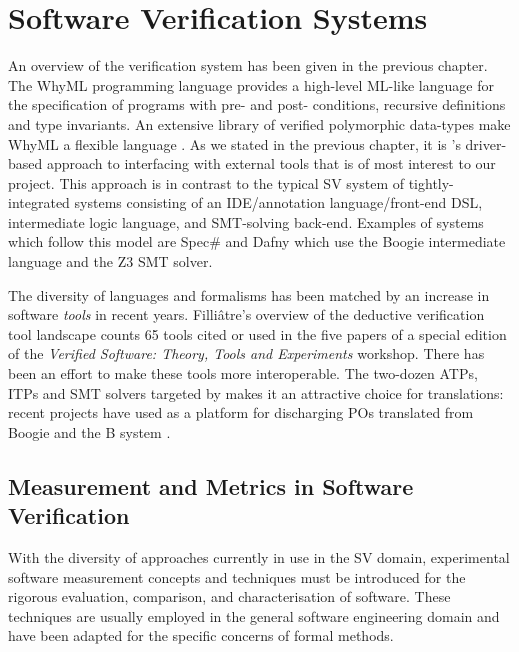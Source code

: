 \section{Software Verification Systems}
\label{sec:lrsv}

An overview of the \why verification system \cite{why:shephard,why:whereprovers} has been given in the previous chapter. The WhyML programming language provides a high-level ML-like language for the specification of programs with pre- and post- conditions, recursive definitions and type invariants. An extensive library of verified polymorphic data-types make WhyML a flexible language \cite{verifythis,why:polymorphic}. As we stated in the previous chapter, it is \why's driver-based approach to interfacing with external tools that is of most interest to our project. This approach is in contrast to the typical SV system of tightly-integrated systems consisting of an IDE/annotation language/front-end DSL, intermediate logic language, and SMT-solving back-end. Examples of systems which follow this model are Spec\# \cite{spec} and Dafny \cite{Dafny} which use the Boogie \cite{Boogie} intermediate language and the Z3 \cite{Z3} SMT solver.

The diversity of languages and formalisms has been matched by an increase in software \textit{tools} in recent years. Filli{\^a}tre's overview of the deductive verification tool landscape \cite{deductiveSV} counts 65 tools cited or used in the five papers of a special edition of the \textit{Verified Software: Theory, Tools and Experiments} workshop. There has been an effort to make these tools more interoperable. The two-dozen ATPs, ITPs and SMT solvers targeted by \why makes it an attractive choice for translations: recent projects have used \why as a platform for discharging POs translated from Boogie \cite{b2w} and the B system \cite{rodinplugin,atelierB2w}. 

\subsection{Measurement and Metrics in Software Verification}
\label{sub:lrsvmm}

With the diversity of approaches currently in use in the SV domain, experimental software measurement concepts and techniques must be introduced for the rigorous evaluation, comparison, and characterisation of software. These techniques are usually employed in the general software engineering domain and have been adapted for the specific concerns of formal methods. 

